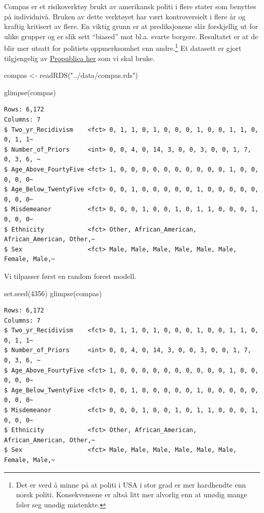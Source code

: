 \documentclass[
  letterpaper,
  DIV=11,
  numbers=noendperiod]{scrreprt}
\newenvironment{Shaded}{\begin{snugshade}}{\end{snugshade}}
\newcommand{\DecValTok}[1]{\textcolor[rgb]{0.68,0.00,0.00}{#1}}
\newcommand{\FunctionTok}[1]{\textcolor[rgb]{0.28,0.35,0.67}{#1}}
\newcommand{\NormalTok}[1]{\textcolor[rgb]{0.00,0.23,0.31}{#1}}
\newcommand{\OtherTok}[1]{\textcolor[rgb]{0.00,0.23,0.31}{#1}}
\newcommand{\StringTok}[1]{\textcolor[rgb]{0.13,0.47,0.30}{#1}}
\theoremstyle{definition}
\theoremstyle{remark}
\begin{document}
Compas er et risikoverktøy brukt av amerikansk politi i flere stater som
benyttes på individnivå. Bruken av dette verktøyet har vært
kontroversielt i flere år og kraftig kritisert av flere. En viktig grunn
er at prediksjonene slår forskjellig ut for ulike grupper og er slik
sett ``biased'' mot bl.a. svarte borgere. Resultatet er at de blir mer
utsatt for politiets oppmerksomhet enn andre.\footnote{Det er verd å
  minne på at politi i USA i stor grad er mer hardhendte enn norsk
  politi. Konsekvensene er altså litt mer alvorlig enn at unødig mange
  føler seg unødig mistenkte.} Et datasett er gjort tilgjengelig av
\href{https://www.propublica.org/datastore/dataset/compas-recidivism-risk-score-data-and-analysis}{Propublica
her} som vi skal bruke.

\begin{Shaded}
\begin{Highlighting}[]
\NormalTok{compas }\OtherTok{\textless{}{-}} \FunctionTok{readRDS}\NormalTok{(}\StringTok{"../data/compas.rds"}\NormalTok{)}

\FunctionTok{glimpse}\NormalTok{(compas)}
\end{Highlighting}
\end{Shaded}

\begin{verbatim}
Rows: 6,172
Columns: 7
$ Two_yr_Recidivism    <fct> 0, 1, 1, 0, 1, 0, 0, 0, 1, 0, 0, 1, 1, 0, 0, 1, 1~
$ Number_of_Priors     <int> 0, 0, 4, 0, 14, 3, 0, 0, 3, 0, 0, 1, 7, 0, 3, 6, ~
$ Age_Above_FourtyFive <fct> 1, 0, 0, 0, 0, 0, 0, 0, 0, 0, 0, 1, 0, 0, 0, 0, 0~
$ Age_Below_TwentyFive <fct> 0, 0, 1, 0, 0, 0, 0, 0, 1, 0, 0, 0, 0, 0, 0, 0, 0~
$ Misdemeanor          <fct> 0, 0, 0, 1, 0, 0, 1, 0, 1, 1, 0, 0, 0, 1, 0, 0, 0~
$ Ethnicity            <fct> Other, African_American, African_American, Other,~
$ Sex                  <fct> Male, Male, Male, Male, Male, Male, Female, Male,~
\end{verbatim}

Vi tilpasser først en random forest modell.

\begin{Shaded}
\begin{Highlighting}[]
\FunctionTok{set.seed}\NormalTok{(}\DecValTok{4356}\NormalTok{)}
\FunctionTok{glimpse}\NormalTok{(compas)}
\end{Highlighting}
\end{Shaded}

\begin{verbatim}
Rows: 6,172
Columns: 7
$ Two_yr_Recidivism    <fct> 0, 1, 1, 0, 1, 0, 0, 0, 1, 0, 0, 1, 1, 0, 0, 1, 1~
$ Number_of_Priors     <int> 0, 0, 4, 0, 14, 3, 0, 0, 3, 0, 0, 1, 7, 0, 3, 6, ~
$ Age_Above_FourtyFive <fct> 1, 0, 0, 0, 0, 0, 0, 0, 0, 0, 0, 1, 0, 0, 0, 0, 0~
$ Age_Below_TwentyFive <fct> 0, 0, 1, 0, 0, 0, 0, 0, 1, 0, 0, 0, 0, 0, 0, 0, 0~
$ Misdemeanor          <fct> 0, 0, 0, 1, 0, 0, 1, 0, 1, 1, 0, 0, 0, 1, 0, 0, 0~
$ Ethnicity            <fct> Other, African_American, African_American, Other,~
$ Sex                  <fct> Male, Male, Male, Male, Male, Male, Female, Male,~
\end{verbatim}
\end{document}
